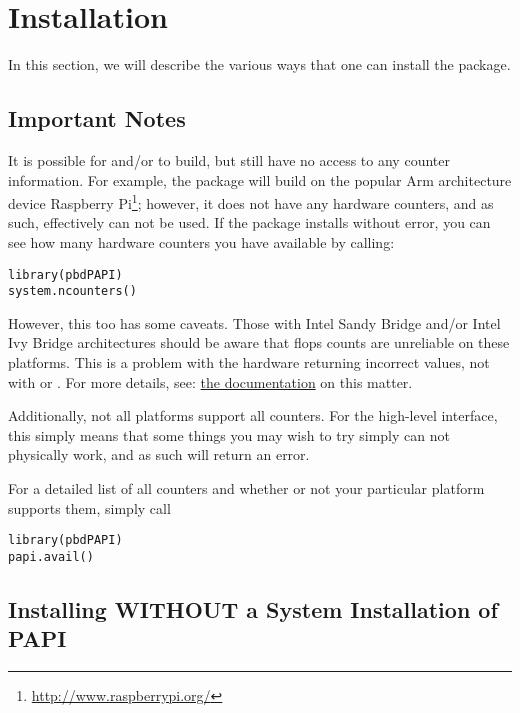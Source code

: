 \section{Installation}
\label{sec:installation}

In this section, we will describe the various ways that one can install the 
\thispackage package.



\subsection{Important Notes}

It is possible for \PAPI and/or \thispackage to build, but still have no access
to any counter information.  For example, the package will build on the popular 
Arm architecture device 
Raspberry Pi\footnote{\url{http://www.raspberrypi.org/}};
however, it does not have any hardware counters, and as such, \thispackage 
effectively can not be used.  If the package installs without error, you can 
see how many hardware counters you have available by calling:
\begin{lstlisting}[language=rr]
library(pbdPAPI)
system.ncounters()
\end{lstlisting}

However, this too has some caveats.  Those with Intel Sandy Bridge and/or Intel 
Ivy Bridge architectures should be aware that flops counts are unreliable on 
these platforms.  This is a problem with the hardware returning incorrect 
values, not with \PAPI or \thispackage.  For more details, see: 
\href{http://icl.cs.utk.edu/projects/papi/wiki/PAPITopics:SandyFlops}%
{the \PAPI documentation} on this matter.


Additionally, not all platforms support all counters.  For the high-level 
interface, this simply means that some things you may wish to try simply can 
not physically work, and as such will return an error.  

For a detailed list of all counters and whether or not your particular platform 
supports them, simply call 
\begin{lstlisting}[language=rr]
library(pbdPAPI)
papi.avail()
\end{lstlisting}





\subsection{Installing WITHOUT a System Installation of PAPI}

